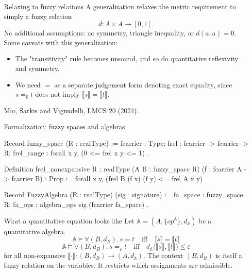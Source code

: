 \documentclass[10pt,aspectratio=169]{beamer}
\newcommand{\qeq}[1]{=_{#1}}
\newcommand{\den}[1]{\llbracket #1 \rrbracket}
\newcommand{\eps}{\varepsilon}
\begin{document}
\begin{frame}{Relaxing to fuzzy relations}
    A generalization relaxes the metric requirement to simply a fuzzy
    relation
    \[ d : A \times A \longrightarrow [0,1] . \]
    \vfill
    No additional assumptions: no symmetry, triangle
    inequality, or $d(a,a) = 0$.
    \vfill
    \pause
    Some caveats with this generalization:
    \begin{itemize}
        \item[--] The "transitivity" rule becomes unsound, and so do
            quantitative reflexivity and symmetry.
        \item[--] We need $=$ as a separate judgement form denoting exact
            equality, since $s \qeq{0} t$ does not imply
            $\den{s} = \den{t}$.
    \end{itemize}
    \vfill
    \hfill{\small Mio, Sarkis and Vignudelli, LMCS 20 (2024).}
\end{frame}

\begin{frame}[fragile]{Formalization: fuzzy spaces and algebras}
    \begin{srcbox}
Record fuzzy_space (R : realType) := {
    fcarrier : Type;
    frel : fcarrier -> fcarrier -> R;
    frel_range : forall x y, (0 <= frel x y <= 1)%
}.

Definition frel_nonexpansive {R : realType} (A B : fuzzy_space R)
    (f : fcarrier A -> fcarrier B) : Prop :=
  forall x y, (frel B (f x) (f y) <= frel A x y)%

Record FuzzyAlgebra (R : realType) (sig : signature) := {
  fa_space : fuzzy_space R;
  fa_ops : algebra_ops sig (fcarrier fa_space)
}.
    \end{srcbox}
\end{frame}

\begin{frame}{What a quantitative equation looks like}
    Let $\mathbb{A} = (A, \{op^{\mathbb{A}}\}, d_{\mathbb{A}})$ be a
    quantitative algebra.
    \vfill
    \[
        \mathbb{A} \models \forall (B,d_B).\, s = t
        \quad\text{iff}\quad
        \den{s} = \den{t}
    \]
    \vspace{-1em}
    \[
        \mathbb{A} \models \forall (B,d_B).\, s \qeq{\eps} t
        \quad\text{iff}\quad
        d_{\mathbb{A}}\bigl(\den{s},\den{t}\bigr) \leq \eps
    \]
    \vfill
    for all non-expansive $\den{\cdot} : (B,d_B) \to
    (A,d_\mathbb{A})$.
    \vfill
    \pause
    {\small The context $(B,d_B)$ is itself a fuzzy relation on the
    variables. It restricts which assignments are admissible. }
\end{frame}
\end{document}
